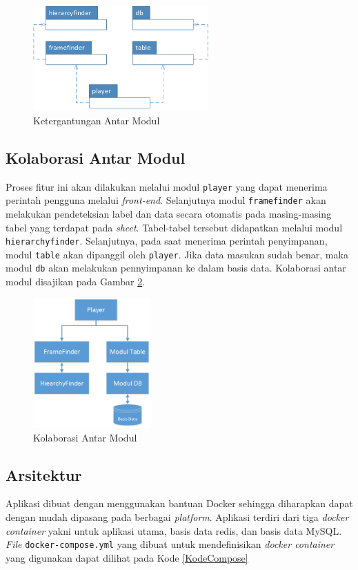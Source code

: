 	\begin{figure}[htb]
	    \centering
	    \includegraphics[width=0.6\textwidth]{resources/chapter-4-module-dependecy.png}
	    \caption{Ketergantungan Antar Modul}
		\label{ModuleDependency}
	\end{figure}

	\subsection{Kolaborasi Antar Modul}
	Proses fitur ini akan dilakukan melalui modul \texttt{player} yang dapat menerima perintah pengguna melalui \textit{front-end}. Selanjutnya modul \texttt{framefinder} akan melakukan pendeteksian label dan data secara otomatis pada masing-masing tabel yang terdapat pada \textit{sheet}. Tabel-tabel tersebut didapatkan melalui modul \texttt{hierarchyfinder}. Selanjutnya, pada saat menerima perintah penyimpanan, modul \texttt{table} akan dipanggil oleh \texttt{player}. Jika data masukan sudah benar, maka modul \texttt{db} akan melakukan pennyimpanan ke dalam basis data. Kolaborasi antar modul disajikan pada Gambar \ref{ModuleFlow}.

	\begin{figure}[htb]
	    \centering
	    \includegraphics[width=0.4\textwidth]{resources/chapter-4-module-flow.png}
	    \caption{Kolaborasi Antar Modul}
		\label{ModuleFlow}
	\end{figure}

	\subsection{Arsitektur}
	Aplikasi dibuat dengan menggunakan bantuan Docker sehingga diharapkan dapat dengan mudah dipasang pada berbagai \textit{platform}. Aplikasi terdiri dari tiga \textit{docker container} yakni untuk aplikasi utama, basis data redis, dan basis data MySQL. \textit{File} \texttt{docker-compose.yml} yang dibuat untuk mendefinisikan \textit{docker container} yang digunakan dapat dilihat pada Kode \ref{KodeCompose}


